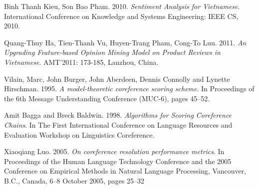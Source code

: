 \documentclass[12pt]{report}
\begin{document}
\begin{thebibliography}{30}
	Binh Thanh Kieu, Son Bao Pham. 2010.
	\textit{Sentiment Analysis for Vietnamese}.
	International Conference on Knowledge and Systems Engineering: IEEE CS, 2010.

	Quang-Thuy Ha, Tien-Thanh Vu, Huyen-Trang Pham, Cong-To Luu. 2011.
	\textit{An Upgrading Feature-based Opinion Mining Model on Product Reviews in Vietnamese}.
	AMT’2011: 173-185, Lanzhou, China.

	Vilain, Marc, John Burger, John Aberdeen, Dennis Connolly and Lynette Hirschman. 1995.
	\textit{A model-theoretic coreference scoring scheme}.
	In Proceedings of the 6th Message Understanding Conference (MUC-6), pages 45–52.

	Amit Bagga and Breck Baldwin. 1998.
	\textit{Algorithms for Scoring Coreference Chains}.
	In The First International Conference on Language Resources and Evaluation Workshop on Linguistics Coreference.

	Xiaoqiang Luo. 2005.
	\textit{On coreference resolution performance metrics}.
	In Proceedings of the Human Language Technology Conference and the 2005 Conference on Empirical Methods in Natural Language Processing, Vancouver, B.C., Canada, 6–8 October 2005, pages 25–32
 
\end{thebibliography}	
\end{document}
